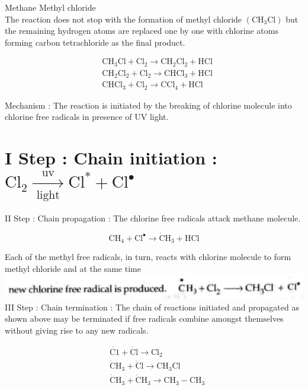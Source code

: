 \documentclass[10pt]{article}
\begin{document}
Methane Methyl chloride\\
The reaction does not stop with the formation of methyl chloride $\left(\mathrm{CH}_{3} \mathrm{Cl}\right)$ but the remaining hydrogen atoms are replaced one by one with chlorine atoms forming carbon tetrachloride as the final product.

$$
\begin{aligned}
& \mathrm{CH}_{3} \mathrm{Cl}+\mathrm{Cl}_{2} \longrightarrow \mathrm{CH}_{2} \mathrm{Cl}_{2}+\mathrm{HCl} \\
& \mathrm{CH}_{2} \mathrm{Cl}_{2}+\mathrm{Cl}_{2} \longrightarrow \mathrm{CHCl}_{3}+\mathrm{HCl} \\
& \mathrm{CHCl}_{3}+\mathrm{Cl}_{2} \longrightarrow \mathrm{CCl}_{4}+\mathrm{HCl}
\end{aligned}
$$

Mechanism : The reaction is initiated by the breaking of chlorine molecule into chlorine free radicals in presence of UV light.

\section*{I Step : Chain initiation : $\mathrm{Cl}_{2} \xrightarrow[\text { light }]{\mathrm{uv}} \mathrm{Cl}^{*}+\mathrm{Cl}^{\bullet}$}
II Step : Chain propagation : The chlorine free radicals attack methane molecule.

$$
\mathrm{CH}_{4}+\mathrm{Cl}^{\bullet} \longrightarrow \dot{\mathrm{C}} \mathrm{H}_{3}+\mathrm{HCl}
$$

Each of the methyl free radicals, in turn, reacts with chlorine molecule to form methyl chloride and at the same time\\
\includegraphics[max width=\textwidth, center]{2025_01_28_8470952b98110cec3aabg-091}\\
III Step : Chain termination : The chain of reactions initiated and propagated as shown above may be terminated if free radicals combine amongst themselves without giving rise to any new radicals.

$$
\begin{aligned}
& \dot{\mathrm{C} 1}+\dot{\mathrm{Cl}} \longrightarrow \mathrm{Cl}_{2} \\
& \dot{\mathrm{C}} \mathrm{H}_{3}+\dot{\mathrm{C}} \mathrm{l} \longrightarrow \mathrm{CH}_{3} \mathrm{Cl} \\
& \dot{\mathrm{C}} \mathrm{H}_{3}+\dot{\mathrm{C}} \mathrm{H}_{3} \longrightarrow \mathrm{CH}_{3}-\mathrm{CH}_{3}
\end{aligned}
$$
\end{document}
